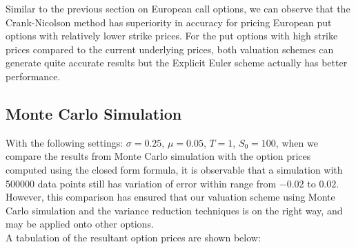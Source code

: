 Similar to the previous section on European call options, we can observe that the Crank-Nicolson method has superiority in accuracy for pricing European put options with relatively lower strike prices. For the put options with high strike prices compared to the current underlying prices, both valuation schemes can generate quite accurate results but the Explicit Euler scheme actually has better performance.
\newpage

\subsection{Monte Carlo Simulation}
With the following settings: $\sigma = 0.25$, $\mu = 0.05$, $T = 1$, $S_{0} = 100$, 
when we compare the results from Monte Carlo simulation with the option prices computed using the closed form formula, it is observable that a simulation with 500000 data points still has variation of error within range from $-0.02$ to $0.02$. However, this comparison has ensured that our valuation scheme using Monte Carlo simulation and the variance reduction techniques is on the right way, and may be applied onto other options.\\[1mm]
A tabulation of the resultant option prices are shown below:
